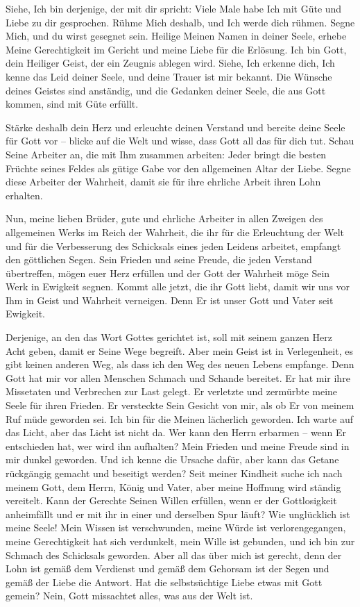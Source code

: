         Siehe, Ich bin derjenige, der mit dir spricht: Viele Male habe Ich mit Güte und Liebe zu dir gesprochen. Rühme Mich deshalb, und Ich werde dich rühmen. Segne Mich, und du wirst gesegnet sein. Heilige Meinen Namen in deiner Seele, erhebe Meine Gerechtigkeit im Gericht und meine Liebe für die Erlösung. Ich bin Gott, dein Heiliger Geist, der ein Zeugnis ablegen wird. Siehe, Ich erkenne dich, Ich kenne das Leid deiner Seele, und deine Trauer ist mir bekannt. Die Wünsche deines Geistes sind anständig, und die Gedanken deiner Seele, die aus Gott kommen, sind mit Güte erfüllt.
        
        Stärke deshalb dein Herz und erleuchte deinen Verstand und bereite deine Seele für Gott vor -- blicke auf die Welt und wisse, dass Gott all das für dich tut. Schau Seine Arbeiter an, die mit Ihm zusammen arbeiten: Jeder bringt die besten Früchte seines Feldes als gütige Gabe vor den allgemeinen Altar der Liebe. Segne diese Arbeiter der Wahrheit, damit sie für ihre ehrliche Arbeit ihren Lohn erhalten. 
        
        Nun, meine lieben Brüder, gute und ehrliche Arbeiter in allen Zweigen des allgemeinen Werks im Reich der Wahrheit, die ihr für die Erleuchtung der Welt und für die Verbesserung des Schicksals eines jeden Leidens arbeitet, empfangt den göttlichen Segen. Sein Frieden und seine Freude, die jeden Verstand übertreffen, mögen euer Herz erfüllen und der Gott der Wahrheit möge Sein Werk in Ewigkeit segnen. Kommt alle jetzt, die ihr Gott liebt, damit wir uns vor Ihm in Geist und Wahrheit verneigen. Denn Er ist unser Gott und Vater seit Ewigkeit. 
        
        Derjenige, an den das Wort Gottes gerichtet ist, soll mit seinem ganzen Herz Acht geben, damit er Seine Wege begreift. Aber mein Geist ist in Verlegenheit, es gibt keinen anderen Weg, als dass ich den Weg des neuen Lebens empfange. Denn Gott hat mir vor allen Menschen Schmach und Schande bereitet. Er hat mir ihre Missetaten und Verbrechen zur Last gelegt. Er verletzte und zermürbte meine Seele für ihren Frieden. Er versteckte Sein Gesicht von mir, als ob Er von meinem Ruf müde geworden sei. Ich bin für die Meinen lächerlich geworden. Ich warte auf das Licht, aber das Licht ist nicht da. Wer kann den Herrn erbarmen -- wenn Er entschieden hat, wer wird ihn aufhalten? Mein Frieden und meine Freude sind in mir dunkel geworden. Und ich kenne die Ursache dafür, aber kann das Getane rückgängig gemacht und beseitigt werden? Seit meiner Kindheit suche ich nach meinem Gott, dem Herrn, König und Vater, aber meine Hoffnung wird ständig vereitelt. Kann der Gerechte Seinen Willen erfüllen, wenn er der Gottlosigkeit anheimfällt und er mit ihr in einer und derselben Spur läuft? Wie unglücklich ist meine Seele! Mein Wissen ist verschwunden, meine Würde ist verlorengegangen, meine Gerechtigkeit hat sich verdunkelt, mein Wille ist gebunden, und ich bin zur Schmach des Schicksals geworden. Aber all das über mich ist gerecht, denn der Lohn ist gemäß dem Verdienst und gemäß dem Gehorsam ist der Segen und gemäß der Liebe die Antwort. Hat die selbstsüchtige Liebe etwas mit Gott gemein? Nein, Gott missachtet alles, was aus der Welt ist. 
        
